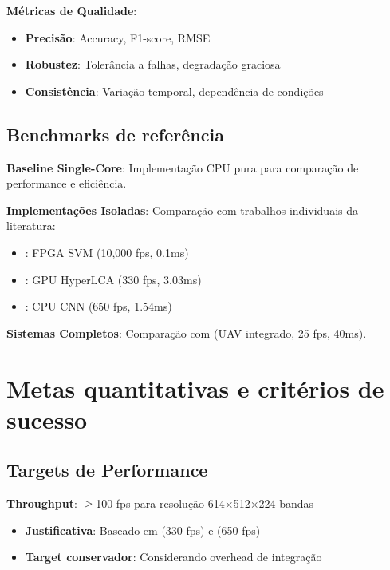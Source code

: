 \textbf{Métricas de Qualidade}:
\begin{itemize}
    \item \textbf{Precisão}: Accuracy, F1-score, RMSE
    \item \textbf{Robustez}: Tolerância a falhas, degradação graciosa
    \item \textbf{Consistência}: Variação temporal, dependência de condições
\end{itemize}

\subsection{Benchmarks de referência}\label{subsec:benchmarks_referencia}

\textbf{Baseline Single-Core}: Implementação CPU pura para comparação de performance e eficiência.

\textbf{Implementações Isoladas}: Comparação com trabalhos individuais da literatura:
\begin{itemize}
    \item \textcite{Martins2019}: FPGA SVM (10,000 fps, 0.1ms)
    \item \textcite{Diaz2019}: GPU HyperLCA (330 fps, 3.03ms)
    \item \textcite{TakuNet2024}: CPU CNN (650 fps, 1.54ms)
\end{itemize}

\textbf{Sistemas Completos}: Comparação com \textcite{Shin2020} (UAV integrado, 25 fps, 40ms).

\section{Metas quantitativas e critérios de sucesso}\label{sec:metas_criterios}

\subsection{Targets de Performance}\label{subsec:targets_performance}

\textbf{Throughput}: $\geq$100 fps para resolução 614$\times$512$\times$224 bandas
\begin{itemize}
    \item \textbf{Justificativa}: Baseado em \textcite{Diaz2019} (330 fps) e \textcite{TakuNet2024} (650 fps)
    \item \textbf{Target conservador}: Considerando overhead de integração
\end{itemize}

